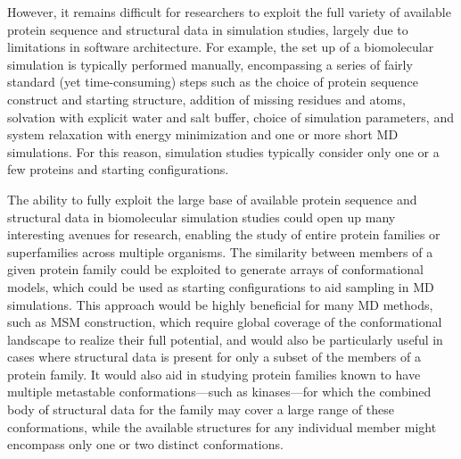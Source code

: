\documentclass[aps,pre,twocolumn,nofootinbib,superscriptaddress,linenumbers]{revtex4-1}
\begin{document}
However, it remains difficult for researchers to exploit the full variety of available protein sequence and structural data in simulation studies, largely due to limitations in software architecture.
For example, the set up of a biomolecular simulation is typically performed manually, encompassing a series of fairly standard (yet time-consuming) steps such as the choice of protein sequence construct and starting structure, addition of missing residues and atoms, solvation with explicit water and salt buffer, choice of simulation parameters, and system relaxation with energy minimization and one or more short MD simulations.
For this reason, simulation studies typically consider only one or a few proteins and starting configurations.

The ability to fully exploit the large base of available protein sequence and structural data in biomolecular simulation studies could open up many interesting avenues for research, enabling the study of entire protein families or superfamilies across multiple organisms.
The similarity between members of a given protein family could be exploited to generate arrays of conformational models, which could be used as starting configurations to aid sampling in MD simulations.
This approach would be highly beneficial for many MD methods, such as MSM construction, which require global coverage of the conformational landscape to realize their full potential, and would also be particularly useful in cases where structural data is present for only a subset of the members of a protein family.
It would also aid in studying protein families known to have multiple metastable conformations---such as kinases---for which the combined body of structural data for the family may cover a large range of these conformations, while the available structures for any individual member might encompass only one or two distinct conformations.
\end{document}
